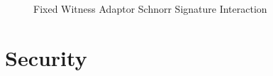 \begin{figure}
    \caption{Fixed Witness Adaptor Schnorr Signature Interaction}
    \label{fig:aptSchnorrInteraction}
\end{figure}

\section{Security}\label{sec:twopartyAptSecurity}

